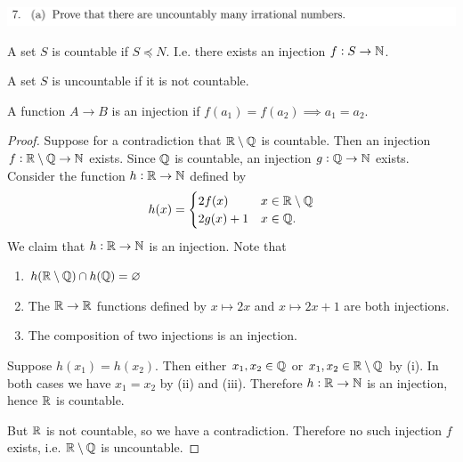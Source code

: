 \documentclass[12pt]{article}
\begin{document}
\subsection{}
\begin{mdframed}
  \includegraphics[width=400pt]{img/oxford-M2-analysis-I-2-7-a.png}
\end{mdframed}
\begin{definition*}[Countable]
  A set $S$ is countable if $S \preceq N$. I.e. there exists an injection $f:S \to \mathbb{N}$.
\end{definition*}
\begin{definition*}[Uncountable]
  A set $S$ is uncountable if it is not countable.
\end{definition*}
\begin{definition*}[Injection]
  A function $A \to B$ is an injection if $f(a_1) = f(a_2) \implies a_1 = a_2$.
\end{definition*}
\begin{proof}
  Suppose for a contradiction that $\mathbb{R} \setminus \mathbb{Q}$ is countable. Then an injection
  $f:\mathbb{R} \setminus \mathbb{Q} \to \mathbb{N}$ exists. Since $\mathbb{Q}$ is countable, an injection $g:\mathbb{Q} \to \mathbb{N}$
  exists. Consider the function $h:\mathbb{R} \to \mathbb{N}$ defined by
  \begin{align*}
    h(x) =
    \begin{cases}
      2f(x) &x \in \mathbb{R} \setminus \mathbb{Q}\\
      2g(x) + 1 &x \in \mathbb{Q}.
    \end{cases}
  \end{align*}
  We claim that $h:\mathbb{R} \to \mathbb{N}$ is an injection. Note that
  \begin{enumerate}[label=(\roman*)]
  \item $h(\mathbb{R}\setminus\mathbb{Q}) \cap h(\mathbb{Q}) = \varnothing$
  \item The $\mathbb{R} \to \mathbb{R}$ functions defined by $x \mapsto 2x$ and $x \mapsto 2x + 1$ are both
    injections.
  \item The composition of two injections is an injection.
  \end{enumerate}
  Suppose $h(x_1) = h(x_2)$. Then either $x_1, x_2 \in \mathbb{Q}$ or $x_1, x_2 \in \mathbb{R}\setminus\mathbb{Q}$ by
  (i). In both cases we have $x_1 = x_2$ by (ii) and (iii). Therefore $h:\mathbb{R} \to \mathbb{N}$ is an
  injection, hence $\mathbb{R}$ is countable.

  But $\mathbb{R}$ is not countable, so we have a contradiction. Therefore no such injection $f$ exists,
  i.e. $\mathbb{R}\setminus\mathbb{Q}$ is uncountable.
\end{proof}
\end{document}
